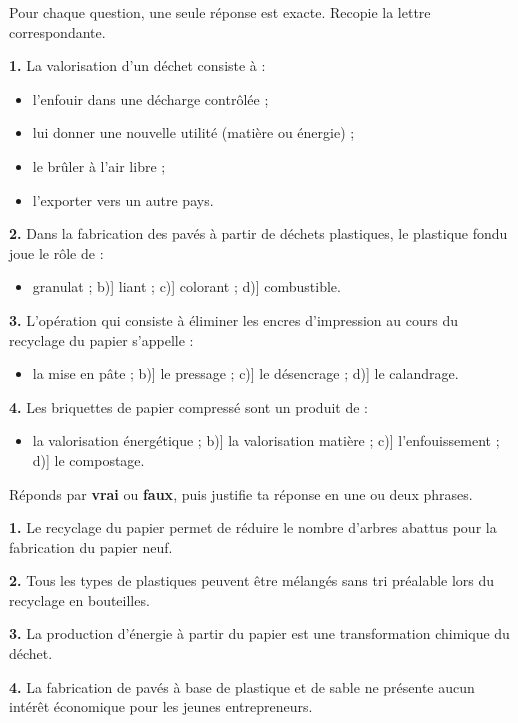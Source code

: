 \documentclass[11pt]{article}
\begin{document}
\begin{exercice}
Pour chaque question, une seule réponse est exacte. Recopie la lettre correspondante.

\textbf{1.} La valorisation d'un déchet consiste à :
\begin{itemize}
\item[a)] l'enfouir dans une décharge contrôlée ;
\item[b)] lui donner une nouvelle utilité (matière ou énergie) ;
\item[c)] le brûler à l'air libre ;
\item[d)] l'exporter vers un autre pays.
\end{itemize}

\textbf{2.} Dans la fabrication des pavés à partir de déchets plastiques, le plastique fondu joue le rôle de :
\begin{itemize}
\item[a)] granulat ; \quad b)] liant ; \quad c)] colorant ; \quad d)] combustible.
\end{itemize}

\textbf{3.} L'opération qui consiste à éliminer les encres d'impression au cours du recyclage du papier s'appelle :
\begin{itemize}
\item[a)] la mise en pâte ; \quad b)] le pressage ; \quad c)] le désencrage ; \quad d)] le calandrage.
\end{itemize}

\textbf{4.} Les briquettes de papier compressé sont un produit de :
\begin{itemize}
\item[a)] la valorisation énergétique ; \quad b)] la valorisation matière ; \quad c)] l'enfouissement ; \quad d)] le compostage.
\end{itemize}
\end{exercice}

\begin{exercice}
Réponds par \textbf{vrai} ou \textbf{faux}, puis justifie ta réponse en une ou deux phrases.

\textbf{1.} Le recyclage du papier permet de réduire le nombre d'arbres abattus pour la fabrication du papier neuf.

\textbf{2.} Tous les types de plastiques peuvent être mélangés sans tri préalable lors du recyclage en bouteilles.

\textbf{3.} La production d'énergie à partir du papier est une transformation chimique du déchet.

\textbf{4.} La fabrication de pavés à base de plastique et de sable ne présente aucun intérêt économique pour les jeunes entrepreneurs.
\end{exercice}
\end{document}

